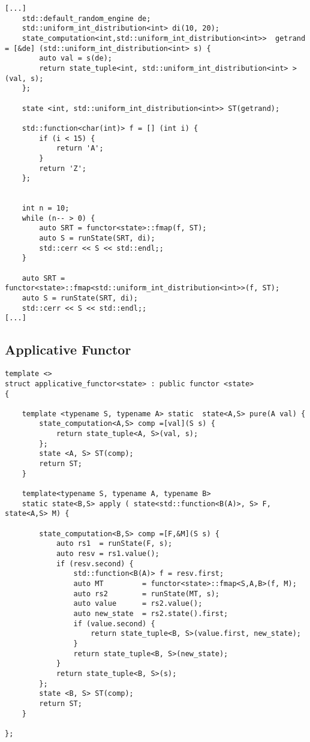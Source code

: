 \documentclass[12pt,fleqn]{article}
\begin{document}
%
%
%
\begin{minipage}{\linewidth}
\begin{lstlisting}[caption=Example of the state functor,label=statefuncexamp]
[...]
	std::default_random_engine de;
	std::uniform_int_distribution<int> di(10, 20);
	state_computation<int,std::uniform_int_distribution<int>>  getrand = [&de] (std::uniform_int_distribution<int> s) {
		auto val = s(de);
		return state_tuple<int, std::uniform_int_distribution<int> >(val, s);
	}; 

	state <int, std::uniform_int_distribution<int>> ST(getrand);

	std::function<char(int)> f = [] (int i) {
		if (i < 15) {
			return 'A';
		}
		return 'Z';
	};


	int n = 10;
	while (n-- > 0) { 
		auto SRT = functor<state>::fmap(f, ST);
		auto S = runState(SRT, di);
		std::cerr << S << std::endl;;
	}

	auto SRT = functor<state>::fmap<std::uniform_int_distribution<int>>(f, ST);
	auto S = runState(SRT, di);
	std::cerr << S << std::endl;;
[...]
\end{lstlisting}
\end{minipage}
%
%
%

%
%
\subsection{Applicative Functor}
%

%
%
%
\begin{minipage}{\linewidth}
\begin{lstlisting}
template <>
struct applicative_functor<state> : public functor <state>
{

	template <typename S, typename A> static  state<A,S> pure(A val) {
		state_computation<A,S> comp =[val](S s) {
			return state_tuple<A, S>(val, s);
		};
		state <A, S> ST(comp);
		return ST;	
	}
	
	template<typename S, typename A, typename B>
	static state<B,S> apply ( state<std::function<B(A)>, S> F, state<A,S> M) {
		
		state_computation<B,S> comp =[F,&M](S s) {
			auto rs1  = runState(F, s);
			auto resv = rs1.value();
			if (resv.second) {
				std::function<B(A)> f = resv.first;
				auto MT         = functor<state>::fmap<S,A,B>(f, M);
				auto rs2        = runState(MT, s);
				auto value      = rs2.value();
				auto new_state  = rs2.state().first;
				if (value.second) {
					return state_tuple<B, S>(value.first, new_state);
				}
				return state_tuple<B, S>(new_state);
			}
			return state_tuple<B, S>(s); 
		};
		state <B, S> ST(comp);
		return ST;	
	}

};
\end{lstlisting}
\end{minipage}
%
%
%
\end{document}
